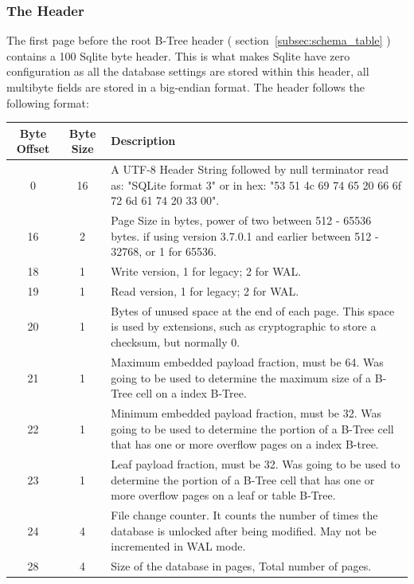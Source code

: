 \subsubsection{The Header}
\label{subsubsec:sqlite_page_hader}

The first page before the root B-Tree header ( section~\ref{subsec:schema_table} ) contains a 100 Sqlite byte header. This is what makes Sqlite have zero configuration as all the database settings are stored within this header, all multibyte fields are stored in a big-endian format. The header follows the following format: 

\begin{longtable}[h]{| c | c | p{10cm} |}
		\hline
			\textbf{Byte Offset} & \textbf{Byte Size} & \textbf{Description} \\ 
		\hline
		\endhead
			0 & 16 & A UTF-8 Header String followed by null terminator read as: "SQLite format 3" or in hex: "53 51 4c 69 74 65 20 66 6f 72 6d 61 74 20 33 00". \\
		\hline
			16 & 2 & Page Size 	in bytes, power of two between 512 - 65536 bytes. if using version 3.7.0.1 and earlier between 512 - 32768, or 1 for 65536. \\
		\hline
			18 & 1 & Write version, 1 for legacy; 2 for WAL. \\
		\hline
			19 & 1 & Read version, 1 for legacy; 2 for WAL. \\
		\hline
			20 & 1 & Bytes of unused space at the end of each page. This space is used by extensions, such as cryptographic to store a checksum, but normally 0. \\
		\hline
			21 & 1 & Maximum embedded payload fraction, must be 64. Was going to be used to determine the maximum size of a B-Tree cell on a index B-Tree. \\
		\hline
			22 & 1 & Minimum embedded payload fraction, must be 32. Was going to be used to determine the portion of a B-Tree cell that has one or more overflow pages on a index B-tree. \\
		\hline
			23 & 1 & Leaf payload fraction, must be 32. Was going to be used to determine the portion of a B-Tree cell that has one or more overflow pages on a leaf or table B-Tree. \\
		\hline
			24 & 4 & File change counter. It counts the number of times the database is unlocked after being modified. May not be incremented in WAL mode. \\
		\hline
			28 & 4 & Size of the database in pages, Total number of pages. \\

\end{longtable}
